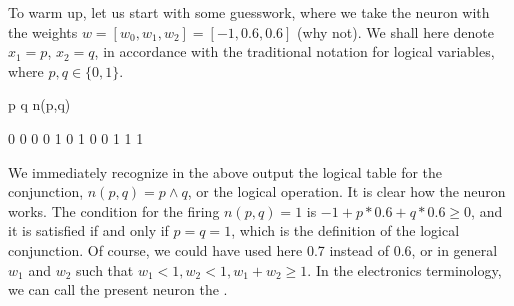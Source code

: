 \documentclass[a4paper,12pt,polish]{jupyterBook}
\begin{document}
\sphinxAtStartPar
To warm up, let us start with some guesswork, where we take the neuron with the weights \(w=[w_0,w_1,w_2]=[-1,0.6,0.6]\) (why not). We shall here denote \(x_1=p\), \(x_2=q\), in accordance with the traditional notation for logical variables, where \(p,q \in \{0,1\}\).
\begin{sphinxVerbatimInput}

\begin{sphinxVerbatim}[commandchars=\\\{\}]
 
             

   \PYG{p}{[}\PYG{p}{]}       
       \PYG{p}{[}\PYG{p}{]}   
        \PYG{p}{[}\PYG{p}{]}\PYG{p}{[}\PYG{p}{]} 
\end{sphinxVerbatim}
\end{sphinxVerbatimInput}
\begin{sphinxVerbatimOutput}

\begin{sphinxVerbatim}[commandchars=\\\{\}]
p q n(p,q)

0 0  0
0 1  0
1 0  0
1 1  1
\end{sphinxVerbatim}
\end{sphinxVerbatimOutput}

\sphinxAtStartPar
We immediately recognize in the above output the logical table for the conjunction, \(n(p,q)=p \land q\), or the logical  operation. It is clear how the neuron works. The condition for the firing \(n(p,q)=1\) is \(-1+p*0.6+q*0.6 \ge 0\), and it is satisfied if and only if \(p=q=1\), which is the definition of the logical conjunction. Of course, we could have used here 0.7 instead of 0.6, or in general \(w_1\) and \(w_2\) such that \(w_1<1, w_2<1, w_1+w_2 \ge 1\). In the electronics terminology, we can call the present neuron the .
\end{document}
